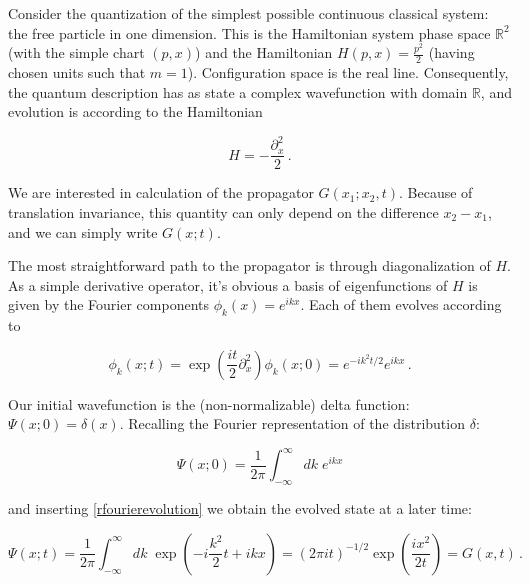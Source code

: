 \documentclass{article}
\newcommand{\ar}{\ensuremath{\mathbb{R}}}
\newcommand{\cmnt}[1]{\textcolor{red}{\emph{#1}}}
\begin{document}
Consider the quantization of the simplest possible continuous classical system: the free particle in one dimension. This is the Hamiltonian system phase space $\ar^2$ (with the simple chart $(p,x)$) and the Hamiltonian $H(p,x) = \frac{p^2}{2}$ (having chosen units such that $m=1$). Configuration space is the real line. Consequently, the quantum description has as state a complex wavefunction with domain $\ar$, and evolution is according to the Hamiltonian

\begin{equation}
    H = - \frac{\partial_x^2}{2}\,.
\end{equation}

We are interested in calculation of the propagator $G(x_1;x_2,t)$. Because of translation invariance, this quantity can only depend on the difference $x_2-x_1$, and we can simply write $G(x;t)$.

%
%
%
%

The most straightforward path to the propagator is through diagonalization of $H$. As a simple derivative operator, it's obvious a basis of eigenfunctions of $H$ is given by the Fourier components $\phi_k(x) = e^{ikx}$. Each of them evolves according to

\begin{equation}
    \label{rfourierevolution}
    \phi_k(x; t) = \exp(\frac{it}{2}\partial_x^2) \phi_k(x;0) = e^{-ik^{2}t/2} e^{ikx}\,.
\end{equation}

Our initial wavefunction is the (non-normalizable) delta function: $\Psi(x;0) = \delta(x)$. Recalling the Fourier representation of the distribution $\delta$:

\begin{equation}
    \Psi(x;0) = \frac{1}{2\pi} \int_{-\infty}^\infty dk \; e^{ikx} 
\end{equation}

and inserting \eqref{rfourierevolution} we obtain the evolved state at a later time:

\begin{equation}
    \Psi(x;t) = \frac{1}{2\pi} \int_{-\infty}^{\infty} dk \; \exp( - i \frac{k^2}{2}t +  ikx ) = (2 \pi i t)^{-1/2} \exp(\frac{ix^2}{2t}) = G(x,t)\,.
\end{equation}
\end{document}
